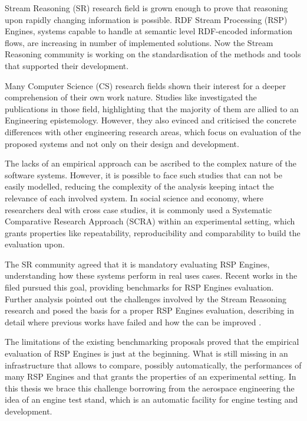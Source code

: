 Stream Reasoning (SR) research field is grown enough to prove that reasoning upon rapidly changing information is possible. RDF Stream Processing (RSP) Engines, systems capable to handle at semantic level RDF-encoded information flows, are increasing in number of implemented solutions. Now the Stream Reasoning community is working on the standardisation of the methods and tools that supported their development. 

Many Computer Science (CS) research fields shown their interest for a deeper comprehension of their own work nature. Studies like \cite{Tichy:1995:EEC:209090.209093, Wainer:2009:EEC:1518331.1518552} investigated the publications in those field, highlighting that the majority of them are allied to an Engineering epistemology. However, they also evinced and criticised the concrete differences with other engineering research areas, which focus on evaluation of the proposed systems and not only on their design and development. 

The lacks of an empirical approach can be ascribed to the complex nature of the software systems. However, it is possible to face such studies that can not be easily modelled, reducing the complexity of the analysis keeping intact the relevance of each involved system. In social science and economy, where researchers deal with cross case studies, it is commonly used a Systematic Comparative Research Approach (SCRA) within an experimental setting, which grants properties like repeatability, reproducibility and comparability to build the evaluation upon.

The SR community agreed that it is mandatory evaluating RSP Engines, understanding how these systems perform in real uses cases. Recent works in the filed \cite{Zhang2012, LePhuoc2012c, DBLP:conf/semweb/DellAglioCBCV13} pursued this goal, providing benchmarks for RSP Engines evaluation. Further analysis pointed out the challenges involved by the Stream Reasoning research and posed the basis for a proper RSP Engines evaluation, describing in detail where previous works have failed and how the can be improved \cite{DBLP:conf/esws/ScharrenbachUMVB13}.

The limitations of the existing benchmarking proposals proved that the empirical evaluation of RSP Engines is just at the beginning. What is still missing in an infrastructure that allows to compare, possibly automatically, the performances of many RSP Engines and that grants the properties of an experimental setting. In this thesis we brace this challenge borrowing from the aerospace engineering the idea of an engine test stand, which is an automatic facility for engine testing and development. 

